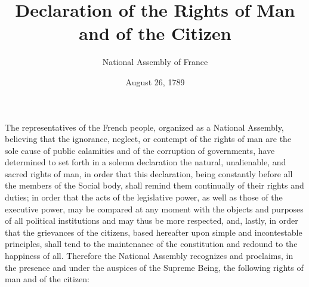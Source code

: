 \documentclass[letterpaper,12pt,twoside]{article}
\begin{document}
\title{Declaration of the Rights of Man and of the Citizen}
\author{National Assembly of France}
\date{August 26, 1789}
\maketitle
The representatives of the French people, organized as a National Assembly, believing that the ignorance, neglect, or contempt of the rights of man are the sole cause of public calamities and of the corruption of governments, have determined to set forth in a solemn declaration the natural, unalienable, and sacred rights of man, in order that this declaration, being constantly before all the members of the Social body, shall remind them continually of their rights and duties; in order that the acts of the legislative power, as well as those of the executive power, may be compared at any moment with the objects and purposes of all political institutions and may thus be more respected, and, lastly, in order that the grievances of the citizens, based hereafter upon simple and incontestable principles, shall tend to the maintenance of the constitution and redound to the happiness of all. Therefore the National Assembly recognizes and proclaims, in the presence and under the auspices of the Supreme Being, the following rights of man and of the citizen:
\end{document}
